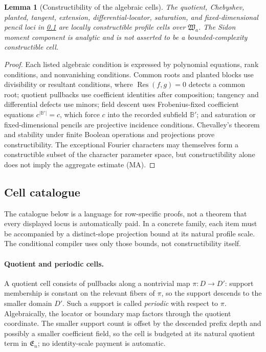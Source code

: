 \documentclass[12pt,a4paper]{amsart}
\numberwithin{equation}{section}
\newtheorem{lemma}[lemma]{Lemma}
\theoremstyle{remark}
\newcommand{\B}{\mathbb B}
\newcommand{\abs}[1]{\lvert #1\rvert}
\begin{document}
\begin{lemma}[Constructibility of the algebraic cells]\label{lem:constructible-cells}
The quotient, Chebyshev, planted, tangent, extension, differential-locator,
saturation, and fixed-dimensional pencil loci in
\cref{sec:cell-catalogue} are locally constructible profile cells over
\(\mathfrak W_a\).
The Sidon moment component is analytic and is not asserted to be a
bounded-complexity constructible cell.
\end{lemma}

\begin{proof}
Each listed algebraic condition is expressed by polynomial equations, rank
conditions, and nonvanishing conditions.  Common roots and planted blocks
use divisibility or resultant conditions, where
\(\operatorname{Res}(f,g)=0\) detects a common root; quotient pullbacks use
coefficient identities after composition; tangency and differential
defects use minors; field descent uses Frobenius-fixed coefficient equations
\(c^{\abs{\B'}}=c\), which force \(c\) into the recorded subfield
\(\B'\);
and saturation or fixed-dimensional pencils are projective incidence
conditions.  Chevalley's theorem and stability under finite Boolean
operations and projections prove constructibility.  The exceptional
Fourier characters may themselves form a constructible subset of the
character parameter space, but constructibility alone does not imply the
aggregate estimate \textup{(MA)}.
\end{proof}

\subsection{Cell catalogue}\label{sec:cell-catalogue}

The catalogue below is a language for row-specific proofs, not a theorem
that every displayed locus is automatically paid.  In a concrete family,
each item must be accompanied by a distinct-slope projection bound at its
natural profile scale.  The conditional compiler uses only those bounds,
not constructibility itself.

\paragraph{Quotient and periodic cells.}
A quotient cell consists of pullbacks along a nontrivial map
\(\pi:D\to D'\): support membership is constant on the relevant fibers
of \(\pi\), so the support descends to the smaller domain \(D'\).  Such a
support is called \emph{periodic} with respect to \(\pi\).  Algebraically,
the locator or boundary map factors
through the quotient coordinate.  The smaller support count is offset by
the descended prefix depth and possibly a smaller coefficient field, so
the cell is budgeted at its natural quotient term in \(\mathfrak E_n\);
no identity-scale payment is automatic.
\end{document}
